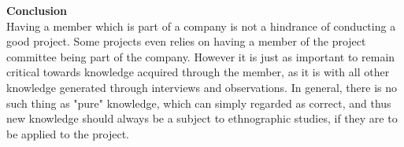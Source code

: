 \textbf{Conclusion}\\


Having a member which is part of a company is not a hindrance of conducting a good project. Some projects even relies on having a member of the project committee being part of the company.
However it is just as important to remain critical towards knowledge acquired through the member, as it is with all other knowledge generated through interviews and observations.
In general, there is no such thing as "pure" knowledge, which can simply regarded as correct, and thus new knowledge should always be a subject to ethnographic studies, if they are to be applied to the project.

